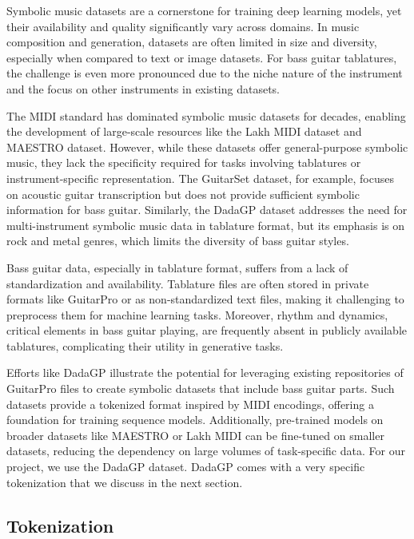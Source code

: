 \documentclass[11pt, a4paper]{article}
\begin{document}
Symbolic music datasets are a cornerstone for training deep learning models, yet their availability and quality significantly vary across domains.
In music composition and generation, datasets are often limited in size and diversity, especially when compared to text or image datasets.
For bass guitar tablatures, the challenge is even more pronounced due to the niche nature of the instrument and the focus on other instruments in existing datasets.


The MIDI standard has dominated symbolic music datasets for decades, enabling the development of large-scale resources like the Lakh MIDI dataset and MAESTRO dataset.
However, while these datasets offer general-purpose symbolic music, they lack the specificity required for tasks involving tablatures or instrument-specific representation.
The GuitarSet dataset, for example, focuses on acoustic guitar transcription but does not provide sufficient symbolic information for bass guitar.
Similarly, the DadaGP dataset addresses the need for multi-instrument symbolic music data in tablature format, but its emphasis is on rock and metal genres, which limits the diversity of bass guitar styles\cite{sarmentoDadaGPDatasetTokenized2021}.


Bass guitar data, especially in tablature format, suffers from a lack of standardization and availability.
Tablature files are often stored in private formats like GuitarPro or as non-standardized text files, making it challenging to preprocess them for machine learning tasks\cite{sarmentoDadaGPDatasetTokenized2021}.
Moreover, rhythm and dynamics, critical elements in bass guitar playing, are frequently absent in publicly available tablatures, complicating their utility in generative tasks.


Efforts like DadaGP illustrate the potential for leveraging existing repositories of GuitarPro files to create symbolic datasets that include bass guitar parts.
Such datasets provide a tokenized format inspired by MIDI encodings, offering a foundation for training sequence models.
Additionally, pre-trained models on broader datasets like MAESTRO or Lakh MIDI can be fine-tuned on smaller datasets, reducing the dependency on large volumes of task-specific data\cite{makrisConditionalDrumsGeneration2022, sarmentoDadaGPDatasetTokenized2021}.
For our project, we use the DadaGP dataset. DadaGP comes with a very specific tokenization that we discuss in the next section.


\subsection*{Tokenization}
\end{document}
